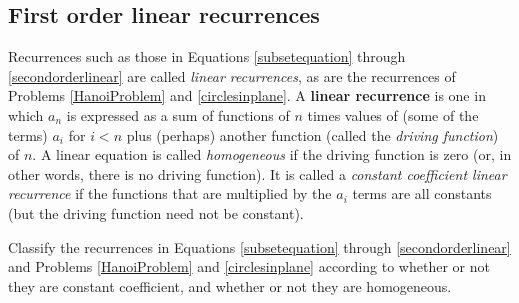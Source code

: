 \subsection{First order linear recurrences}  Recurrences such as those in
Equations \ref{subsetequation} through \ref{secondorderlinear} are called
{\em linear recurrences}, as are the recurrences of Problems
\ref{HanoiProblem} and
\ref{circlesinplane}.  A {\bf linear recurrence} is one in which $a_n$ is expressed as a sum of functions of
$n$ times values of (some of the terms) $a_i$ for $i<n$ plus (perhaps)
another function (called the {\em driving function}) of
$n$.  A linear equation is called {\em homogeneous} if  the
driving function is zero (or, in other words, there is no driving
function).  It is called a {\em constant coefficient linear
recurrence} if the functions that are multiplied by the
$a_i$ terms are all constants (but the driving function need not
be constant).
\bp 
\item Classify the recurrences in Equations \ref{subsetequation} through
\ref{secondorderlinear} and Problems \ref{HanoiProblem} and
\ref{circlesinplane} according to whether or not they are constant
coefficient, and whether or not they are
homogeneous.\label{classifyrecurrences}

